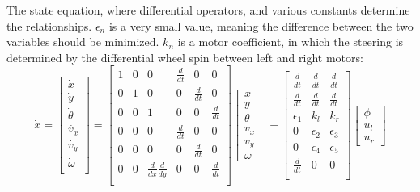 \noindent The state equation, where differential operators, and various constants determine the relationships. $\epsilon_n$ is a very small value, meaning the difference between the two variables should be minimized. $k_n$ is a motor coefficient, in which the steering is determined by the differential wheel spin between left and right motors:
\[\dot{x} =
\begin{bmatrix}
	\dot{x}\\ \dot{y}\\ \dot{\theta}\\ \dot{v_x}\\ \dot{v_y}\\ \dot{\omega}\\
\end{bmatrix} = 
\begin{bmatrix}
	1 & 0 & 0 & \frac{d}{dt} & 0 & 0 \\
	0 & 1 & 0 & 0 & \frac{d}{dt} & 0 \\
	0 & 0 & 1 & 0 & 0 & \frac{d}{dt} \\
	0 & 0 & 0 & \frac{d}{dt} & 0 & 0 \\
	0 & 0 & 0 & 0 & \frac{d}{dt} & 0 \\
	0 & 0 & \frac{d}{dx}\frac{d}{dy} & 0 & 0 & \frac{d}{dt} \\
\end{bmatrix}
\begin{bmatrix}
	x\\ y\\ \theta\\ v_x\\ v_y\\ \omega
\end{bmatrix} + 
\begin{bmatrix}
	\frac{d}{dt} & \frac{d}{dt} & \frac{d}{dt} \\
	\frac{d}{dt} & \frac{d}{dt} & \frac{d}{dt} \\
	\epsilon_1 & k_l & k_r \\
	0 & \epsilon_2 & \epsilon_3 \\
	0 & \epsilon_4 & \epsilon_5 \\
	\frac{d}{dt} & 0 & 0\\
\end{bmatrix}
\begin{bmatrix}
	\phi\\ u_l\\ u_r
\end{bmatrix}
\]

